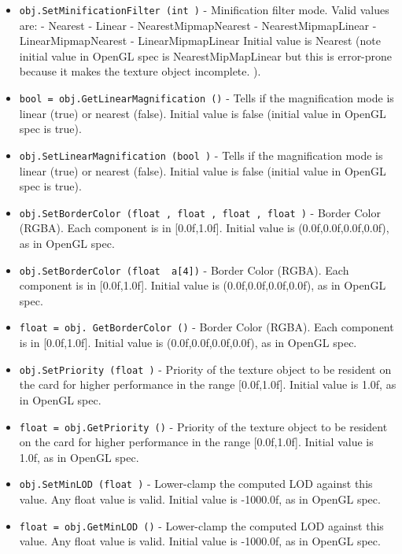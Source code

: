 \begin{itemize}
\item  \verb|obj.SetMinificationFilter (int )| -  Minification filter mode.
 Valid values are:
 - Nearest
 - Linear
 - NearestMipmapNearest
 - NearestMipmapLinear
 - LinearMipmapNearest
 - LinearMipmapLinear
 Initial value is Nearest (note initial value in OpenGL spec
 is NearestMipMapLinear but this is error-prone because it makes the
 texture object incomplete. ).

\item  \verb|bool = obj.GetLinearMagnification ()| -  Tells if the magnification mode is linear (true) or nearest (false).
 Initial value is false (initial value in OpenGL spec is true).

\item  \verb|obj.SetLinearMagnification (bool )| -  Tells if the magnification mode is linear (true) or nearest (false).
 Initial value is false (initial value in OpenGL spec is true).

\item  \verb|obj.SetBorderColor (float , float , float , float )| -  Border Color (RGBA). Each component is in [0.0f,1.0f].
 Initial value is (0.0f,0.0f,0.0f,0.0f), as in OpenGL spec.

\item  \verb|obj.SetBorderColor (float  a[4])| -  Border Color (RGBA). Each component is in [0.0f,1.0f].
 Initial value is (0.0f,0.0f,0.0f,0.0f), as in OpenGL spec.

\item  \verb|float = obj. GetBorderColor ()| -  Border Color (RGBA). Each component is in [0.0f,1.0f].
 Initial value is (0.0f,0.0f,0.0f,0.0f), as in OpenGL spec.

\item  \verb|obj.SetPriority (float )| -  Priority of the texture object to be resident on the card for higher
 performance in the range [0.0f,1.0f].
 Initial value is 1.0f, as in OpenGL spec.

\item  \verb|float = obj.GetPriority ()| -  Priority of the texture object to be resident on the card for higher
 performance in the range [0.0f,1.0f].
 Initial value is 1.0f, as in OpenGL spec.

\item  \verb|obj.SetMinLOD (float )| -  Lower-clamp the computed LOD against this value. Any float value is valid.
 Initial value is -1000.0f, as in OpenGL spec.

\item  \verb|float = obj.GetMinLOD ()| -  Lower-clamp the computed LOD against this value. Any float value is valid.
 Initial value is -1000.0f, as in OpenGL spec.


\end{itemize}
